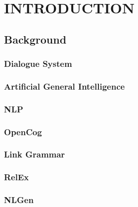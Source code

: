 \renewcommand{\thechapter}{\Roman{chapter}}
\chapter{INTRODUCTION}
\renewcommand{\thechapter}{\arabic{chapter}}

\section{Background}


\subsection{Dialogue System}

\subsection{Artificial General Intelligence}

\subsection{NLP}

\subsection{OpenCog}

\subsection{Link Grammar}

\subsection{RelEx}

\subsection{NLGen}


